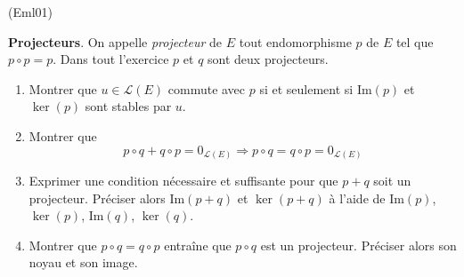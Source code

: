 \begin{tiny}(Eml01)\end{tiny}
\textbf{Projecteurs}. On appelle \emph{projecteur} de $E$ tout endomorphisme $p$ de $E$ tel que $p\circ p=p$. Dans tout l'exercice $p$ et $q$ sont deux projecteurs.
\begin{enumerate}
\item Montrer que $u \in \mathcal{L}(E)$ commute avec $p$ si et seulement si $\mathrm{Im}(p)$ et $\ker(p)$ sont stables par $u$.

\item Montrer que
\begin{displaymath}
 p\circ q+q\circ p=0_{\mathcal{L}(E)} \Rightarrow p\circ q=q\circ p=0_{\mathcal{L}(E)} 
\end{displaymath}

\item Exprimer une condition nécessaire et suffisante pour que $p+q$ soit un projecteur. Pr{\'e}ciser alors $\mathrm{Im}(p+q)$ et $\ker (p+q)$ {\`a} l'aide de $\mathrm{Im}(p)$, $\ker (p)$, $\mathrm{Im}(q)$, $\ker (q)$.

\item Montrer que $p\circ q=q\circ p$ entraîne que $p\circ q$ est un projecteur. Pr{\'e}ciser alors son noyau et son image.
\end{enumerate}
